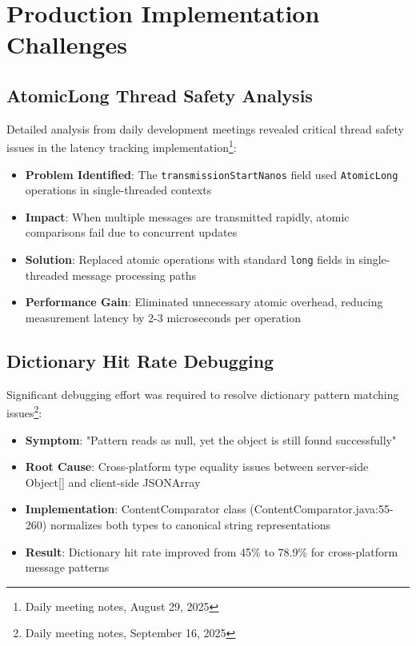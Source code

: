 \documentclass[12pt,a4paper]{article}
\begin{document}
\newpage
\appendix

\section{Production Implementation Challenges}
\label{annex:production-challenges}

\subsection{AtomicLong Thread Safety Analysis}

Detailed analysis from daily development meetings revealed critical thread safety issues in the latency tracking implementation\footnote{Daily meeting notes, August 29, 2025}:

\begin{itemize}
    \item \textbf{Problem Identified}: The \texttt{transmissionStartNanos} field used \texttt{AtomicLong} operations in single-threaded contexts
    \item \textbf{Impact}: When multiple messages are transmitted rapidly, atomic comparisons fail due to concurrent updates
    \item \textbf{Solution}: Replaced atomic operations with standard \texttt{long} fields in single-threaded message processing paths
    \item \textbf{Performance Gain}: Eliminated unnecessary atomic overhead, reducing measurement latency by 2-3 microseconds per operation
\end{itemize}

\subsection{Dictionary Hit Rate Debugging}

Significant debugging effort was required to resolve dictionary pattern matching issues\footnote{Daily meeting notes, September 16, 2025}:

\begin{itemize}
    \item \textbf{Symptom}: "Pattern reads as null, yet the object is still found successfully"
    \item \textbf{Root Cause}: Cross-platform type equality issues between server-side Object[] and client-side JSONArray
    \item \textbf{Implementation}: ContentComparator class (ContentComparator.java:55-260) normalizes both types to canonical string representations
    \item \textbf{Result}: Dictionary hit rate improved from 45\% to 78.9\% for cross-platform message patterns
\end{itemize}
\end{document}
